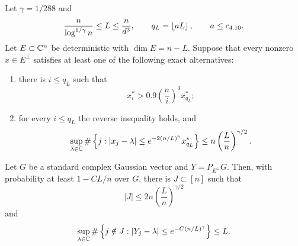 \begin{proposition}\label{prop:Gaussian-anti-clustering}
Let $\gamma=1/288$ and
\[
  \frac{n}{\log^{1/\gamma}n}\le L\le\frac n{d^3},
  \qquad
  q_L=\left\lfloor aL\right\rfloor,
  \qquad
  a\le c_{4.10}.
\]
Let $E\subset\mathbb C^n$ be deterministic with $\dim E=n-L$. Suppose that every nonzero $x\in E^\perp$ satisfies at least one of the following exact alternatives:
\begin{enumerate}[label=\textup{(\roman*)}]
\item there is $i\le q_L$ such that
\[
  x_i^*>0.9\left(\frac ni\right)^3x_{q_L}^*;
\]
\item for every $i\le q_L$ the reverse inequality holds, and
\[
  \sup_{\lambda\in\mathbb C}
  \#\left\{j:|x_j-\lambda|
  \le e^{-2(n/L)^\gamma}x_{q_L}^*\right\}
  \le n\left(\frac Ln\right)^{\gamma/2}.
\]
\end{enumerate}
Let $G$ be a standard complex Gaussian vector and $Y=P_{E^\perp}G$. Then, with probability at least $1-CL/n$ over $G$, there is $J\subset[n]$ such that
\begin{equation}\label{eq:Gaussian-exceptional-size}
  |J|\le2n\left(\frac Ln\right)^{\gamma/2}
\end{equation}
and
\begin{equation}\label{eq:Gaussian-anti-cluster}
  \sup_{\lambda\in\mathbb C}
  \#\left\{j\notin J:|Y_j-\lambda|\le e^{-C(n/L)^\gamma}\right\}
  \le L.
\end{equation}
\end{proposition}


